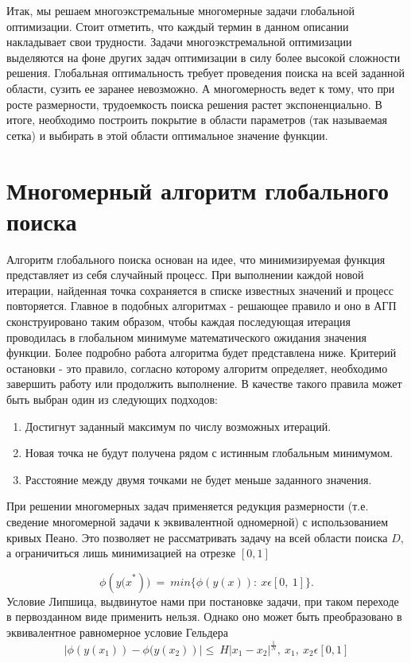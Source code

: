 \documentclass[12pt, a4paper, russian]{article}
\begin{document}
Итак, мы решаем многоэкстремальные многомерные задачи глобальной оптимизации. Стоит отметить, что каждый термин в данном описании накладывает свои трудности. Задачи многоэкстремальной оптимизации выделяются на фоне других задач оптимизации в силу более высокой сложности решения. Глобальная оптимальность требует проведения поиска на всей заданной области, сузить ее заранее невозможно. А многомерность ведет к тому, что при росте размерности, трудоемкость поиска решения растет экспоненциально. В итоге, необходимо построить покрытие в области параметров (так называемая сетка) и выбирать в этой области оптимальное значение функции. 


\section{Многомерный алгоритм глобального поиска}

Алгоритм глобального поиска основан на идее, что минимизируемая функция представляет из себя случайный процесс. При выполнении каждой новой итерации, найденная точка сохраняется в списке известных значений и  процесс повторяется. Главное в подобных алгоритмах - решающее правило и оно в АГП сконструировано таким образом, чтобы каждая последующая итерация проводилась в глобальном минимуме математического ожидания значения функции. Более подробно работа алгоритма будет представлена ниже. Критерий остановки - это правило, согласно которому алгоритм определяет, необходимо завершить работу или продолжить выполнение. В качестве такого правила может быть выбран один из следующих подходов: 
\begin{enumerate}
	\item Достигнут заданный максимум по числу возможных итераций. 
 \item Новая точка не будут получена рядом с истинным глобальным минимумом.
	\item Расстояние между двумя точками не будет меньше заданного значения.
\end{enumerate}

При решении многомерных задач применяется редукция размерности (т.е. сведение многомерной задачи к эквивалентной одномерной) с использованием кривых Пеано. Это позволяет не рассматривать задачу на всей области поиска $D$, а ограничиться лишь минимизацией на отрезке $[0, 1]$

\begin{equation*}
	\phi({y(x}^\ast))\ =\ min\{\phi(y(x)):\ x\epsilon[0,\ 1]\}.
\end{equation*}
Условие Липшица, выдвинутое нами при постановке задачи, при таком переходе в первозданном виде применить нельзя. Однако оно может быть преобразовано в эквивалентное равномерное условие Гельдера
\begin{equation*}
	\left|\phi (y \left(x_1\right))- \phi (y \left(x_2\right)\right )|\le\ H\left|x_1-x_2\right|^\frac{1}{N},\ x_1,\ x_2\epsilon[0,1]		
\end{equation*}
\end{document}
